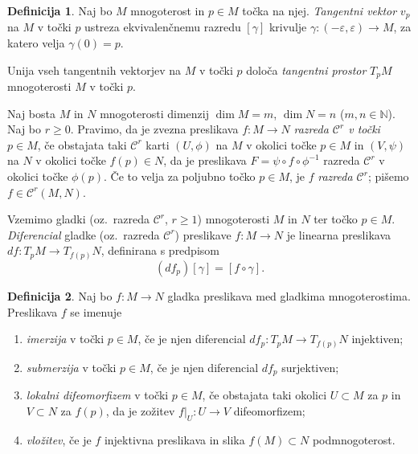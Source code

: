 \documentclass[12pt,a4paper,twoside]{article}
\theoremstyle{definition} %
\newtheorem{definicija}{Definicija}[section]
\theoremstyle{plain} %
\numberwithin{equation}{section}  %
\newcommand{\N}{\mathbb N}
\begin{document}
\begin{definicija}
Naj bo $M$ mnogoterost in $p \in M$ točka na njej. \emph{Tangentni vektor} $v_{p}$ na $M$ v točki $p$ ustreza ekvivalenčnemu razredu $[\gamma]$ krivulje $\gamma \colon (-\varepsilon, \varepsilon) \to M$, za katero velja $\gamma (0) = p$.

Unija vseh tangentnih vektorjev na $M$ v točki $p$ določa \emph{tangentni prostor} $T_{p}M$ mnogoterosti $M$ v točki $p$.
\end{definicija}

Naj bosta $M$ in $N$ mnogoterosti dimenzij $\dim M = m$, $\dim N = n$ ($m, n \in \N$). Naj bo $r \geq 0$. Pravimo, da je zvezna preslikava $f \colon M \to N$ \emph{razreda $\mathcal{C}^{r}$ v točki} $p \in M$, če obstajata taki $\mathcal{C}^{r}$ karti $(U, \phi)$ na $M$ v okolici točke $p \in M$ in $(V, \psi)$ na $N$ v okolici točke $f(p) \in N$, da je preslikava $F = \psi \circ f \circ \phi^{-1}$ razreda $\mathcal{C}^{r}$ v okolici točke $\phi(p)$.
Če to velja za poljubno točko $p \in M$, je $f$ \emph{razreda $\mathcal{C}^{r}$}; pišemo $f \in  \mathcal{C}^{r}(M,N)$.

Vzemimo gladki (oz.~razreda $\mathcal{C}^{r}$, $r \geq 1$) mnogoterosti $M$ in $N$ ter točko $p \in M$. \emph{Diferencial} gladke (oz.~razreda $\mathcal{C}^{r}$) preslikave $f \colon M \to N$ je linearna preslikava $df \colon T_{p}M \to T_{f(p)}N$, definirana s predpisom
\begin{equation}
(df_{p})[\gamma] = [f \circ \gamma].
\end{equation}

\begin{definicija}
Naj bo $f \colon M \to N$ gladka preslikava med gladkima mnogoterostima. Preslikava $f$ se imenuje 
\begin{enumerate}
\item \emph{imerzija} v točki $p \in M$, če je njen diferencial $df_{p} \colon T_{p}M \to T_{f(p)}N$ injektiven;
\item \emph{submerzija} v točki $p \in M$, če je njen diferencial $df_{p}$ surjektiven;
\item \emph{lokalni difeomorfizem} v točki $p \in M$, če obstajata taki okolici $U \subset M$ za $p$ in $V \subset N$ za $f(p)$, da je zožitev $f|_{U} \colon U \to V$ difeomorfizem;
\item \emph{vložitev}, če je $f$ injektivna preslikava in slika $f(M) \subset N$ podmnogoterost.
\end{enumerate}
\end{definicija}
\end{document}
